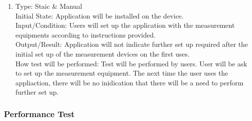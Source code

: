 \documentclass[12pt, titlepage]{article}
\begin{document}
\begin{adjustwidth}{2.2em}{0pt}
\begin{enumerate}[{NF-UT}1.]
    \item Type: Staic \& Manual\\
    Initial State: Application will be installed on the device.\\
    Input/Condition: Users will set up the application with the measurement equipments according to instructions provided.\\
    Output/Result: Application will not indicate further set up required after the initial set up of the measurement devices on the first uses.\\
    How test will be performed: Test will be performed by users. User will be ask to set up the measurement equipment. The next time the user uses the appliaction, there will be no inidication that there will be a need to perform further set up. 
\end{enumerate}
\end{adjustwidth}

\subsubsection{Performance Test}
\end{document}
